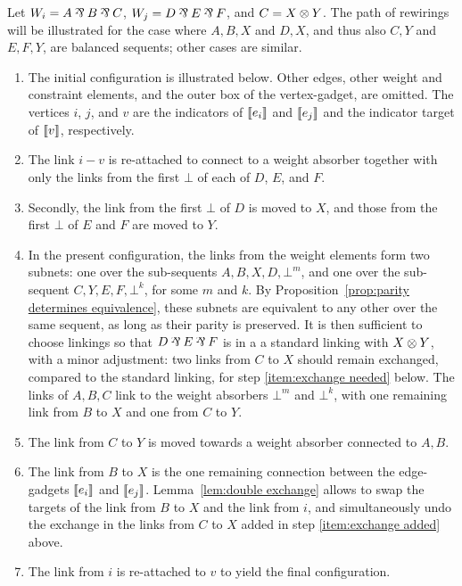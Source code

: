 \documentclass[conference]{IEEEtran}
\begin{document}
\begin{IEEEproof}
Let $W_i=A\parr B\parr C$, $W_j=D\parr E\parr F$, and $C=X\otimes Y$.
%
The path of rewirings will be illustrated for the case where $A,B,X$ and $D,X$, and thus also $C,Y$ and $E,F,Y$, are balanced sequents; other cases are similar.
%
\begin{enumerate}
	\item
The initial configuration is illustrated below. 
%
Other edges, other weight and constraint elements, and the outer box of the vertex-gadget, are omitted.
%
The vertices $i$, $j$, and  $v$ are the indicators of $\llbracket e_i\rrbracket$ and $\llbracket e_j\rrbracket$ and the indicator target of $\llbracket v\rrbracket$, respectively.
%


	\item
The link $i-v$ is re-attached to connect to a weight absorber together with only the links from the first $\bot$ of each of $D$, $E$, and $F$. 
%


	\item
Secondly, the link from the first $\bot$ of $D$ is moved to $X$, and those from the first $\bot$ of $E$ and $F$ are moved to $Y$.
%


	\item\label{item:exchange added}
In the present configuration, the links from the weight elements form two subnets: one over the sub-sequents $A,B,X,D,\bot^m$, and one over the sub-sequent $C,Y,E,F,\bot^k$, for some $m$ and $k$.
%
By Proposition~\ref{prop:parity determines equivalence}, these subnets are equivalent to any other over the same sequent, as long as their parity is preserved.
%
It is then sufficient to choose linkings so that $D\parr E\parr F$ is in a a standard linking with $X\otimes Y$, with a minor adjustment: two links from $C$ to $X$ should remain exchanged, compared to the standard linking, for step \ref{item:exchange needed} below.
%
The links of $A,B,C$ link to the weight absorbers $\bot^m$ and $\bot^k$, with one remaining link from $B$ to $X$ and one from $C$ to $Y$.
%
\displayOcto{\octorollC}


	\item
The link from $C$ to $Y$ is moved towards a weight absorber connected to $A,B$.
%


	\item\label{item:exchange needed}
The link from $B$ to $X$ is the one remaining connection between the edge-gadgets $\llbracket e_i\rrbracket$ and $\llbracket e_j\rrbracket$.
%
Lemma~\ref{lem:double exchange} allows to swap the targets of the link from $B$ to $X$ and the link from $i$, and simultaneously undo the exchange in the links from $C$ to $X$ added in step \ref{item:exchange added} above.
%


	\item
The link from $i$ is re-attached to $v$ to yield the final configuration.
%


\end{enumerate}
\end{IEEEproof}
\end{document}
